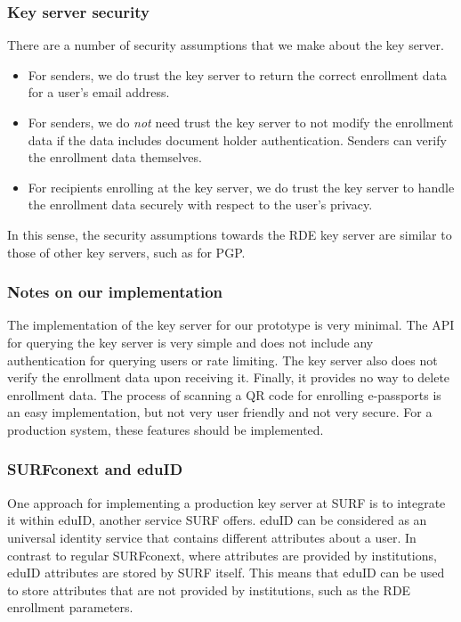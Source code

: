 \subsubsection{Key server security}\label{subsubsec:key-server-security}
There are a number of security assumptions that we make about the key server.
\begin{itemize}
    \item For senders, we do trust the key server to return the correct enrollment data for a user's email address.
    \item For senders, we do \emph{not} need trust the key server to not modify the enrollment data if the data includes document holder authentication.
    Senders can verify the enrollment data themselves.
    \item For recipients enrolling at the key server, we do trust the key server to handle the enrollment data securely with respect to the user's privacy.
\end{itemize}
In this sense, the security assumptions towards the RDE key server are similar to those of other key servers, such as for PGP.

\subsubsection{Notes on our implementation}\label{subsubsec:keyserver-notes-on-our-implementation}
The implementation of the key server for our prototype is very minimal.
The API for querying the key server is very simple and does not include any authentication for querying users or rate limiting.
The key server also does not verify the enrollment data upon receiving it.
Finally, it provides no way to delete enrollment data.
The process of scanning a QR code for enrolling e-passports is an easy implementation, but not very user friendly and not very secure.
For a production system, these features should be implemented.

\subsubsection{SURFconext and eduID}\label{subsubsec:surfconext-and-eduid}
One approach for implementing a production key server at SURF is to integrate it within eduID, another service SURF offers.
eduID can be considered as an universal identity service that contains different attributes about a user.
In contrast to regular SURFconext, where attributes are provided by institutions, eduID attributes are stored by SURF itself.
This means that eduID can be used to store attributes that are not provided by institutions, such as the RDE enrollment parameters.


